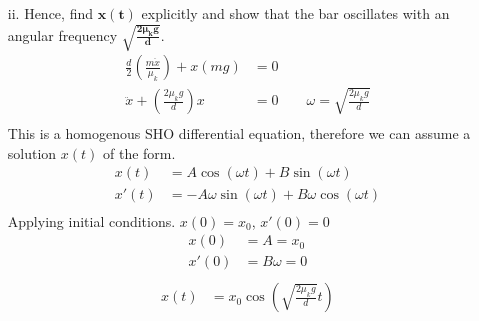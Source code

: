 \documentclass[]{article}
\begin{document}
{\begin{enumerate}
\begin{enumerate}
\begin{enumerate}
						\paragraph{} A convenient point would be the center of the bar, as it takes into account $x(t)$ and removes torque from $mg$. Taking clockwise rotation as positive. $\alpha = 0$ as the bar is not rotating.
						\begin{equation*}
							\begin{split}
								\sum \tau &= I\alpha = 0 \\
								\tau_1 - \tau_2 &= 0 \\
								N_1 \left( \tfrac{d}{2} + x \right) - N_2 \left( \tfrac{d}{2} - x \right) &= 0 \\
								N_1\tfrac{d}{2} + N_1x - N_2\tfrac{d}{2} + N_2x  &= 0 \\
								\frac{d}{2} (N_1 - N_2) + x(N_1 + N_2) &= 0 \\
							\end{split}
						\end{equation*}
				\end{enumerate}
				\item[ii.] Hence, find $\bm{x(t)}$ explicitly and show that the bar oscillates with an angular frequency $\bm{\sqrt{\frac{2\mu_k g}{d}}}$.
					\begin{equation*}
						\begin{split}
							\frac{d}{2} \left(\frac{m\ddot{x}}{\mu_k}\right) + x(mg) &= 0 \\
							\ddot{x} + \left( \frac{2 \mu_k g}{d} \right)x &= 0 \quad \quad \omega = \sqrt{\frac{2 \mu_k g}{d}} \\
						\end{split}
					\end{equation*}
					This is a homogenous SHO differential equation, therefore we can assume a solution $x(t)$ of the form.
					\begin{equation*}
						\begin{split}
							x(t) &= A\cos(\omega t) + B\sin(\omega t) \\
							x'(t) &= -A\omega\sin(\omega t) + B\omega\cos(\omega t) \\
						\end{split}
					\end{equation*}
					Applying initial conditions. $x(0) = x_0$, $x'(0) = 0$
					\begin{equation*}
						\begin{split}
							x(0) &= A = x_0 \\
							x'(0) &= B\omega = 0 \\
						\end{split}
					\end{equation*}
					\begin{equation*}
						\begin{split}
							x(t) &= x_0\cos(\sqrt{\tfrac{2 \mu_k g}{d}} t) \\
						\end{split}
					\end{equation*}
			\end{enumerate}


\end{enumerate}}
\end{document}

